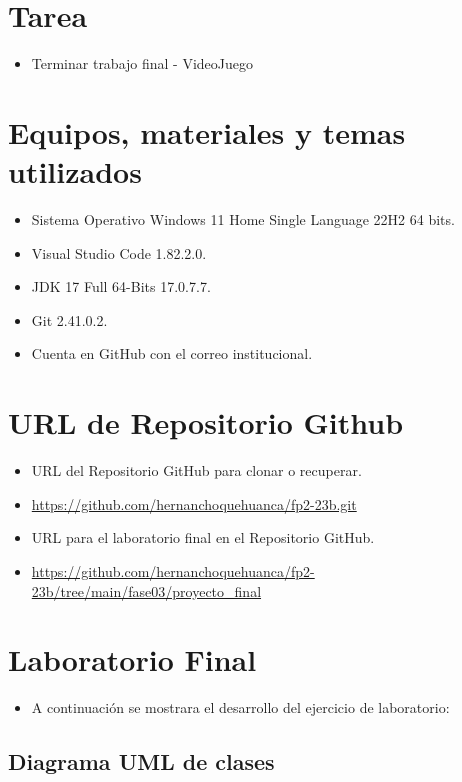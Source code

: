 \documentclass{article}
\begin{document}
	\section{Tarea}
	\begin{itemize}		
		\item Terminar trabajo final - VideoJuego
	\end{itemize}
		
	\section{Equipos, materiales y temas utilizados}
	\begin{itemize}
		\item Sistema Operativo Windows 11 Home Single Language 22H2 64 bits.
		\item Visual Studio Code 1.82.2.0.
		\item JDK 17 Full 64-Bits 17.0.7.7.
		\item Git 2.41.0.2.
		\item Cuenta en GitHub con el correo institucional.
	\end{itemize}
	
	\section{URL de Repositorio Github}
	\begin{itemize}
		\item URL del Repositorio GitHub para clonar o recuperar.
		\item \url{https://github.com/hernanchoquehuanca/fp2-23b.git}
		\item URL para el laboratorio final en el Repositorio GitHub.
		\item \url{https://github.com/hernanchoquehuanca/fp2-23b/tree/main/fase03/proyecto_final}
	\end{itemize}
	
	\section{Laboratorio Final}
	
	\begin{itemize}	
		\item A continuación se mostrara el desarrollo del ejercicio de laboratorio:
	\end{itemize}
	
	\subsection{Diagrama UML de clases}
	
\end{document}
